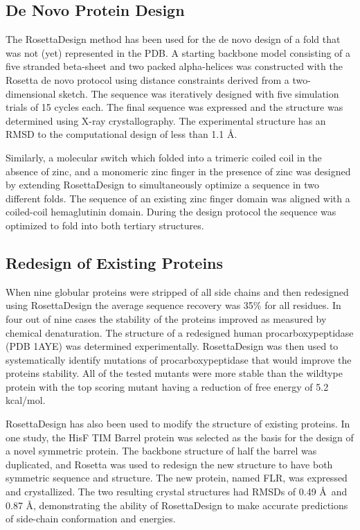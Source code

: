 \subsection{De Novo Protein Design}

The RosettaDesign method has been used for the de novo design of a fold that was not (yet) represented in the PDB.
A starting backbone model consisting of a five stranded beta-sheet and two packed alpha-helices was constructed with the Rosetta de novo protocol using distance constraints derived from a two-dimensional sketch\citep{Rohl:2004dh}.
The sequence was iteratively designed with five simulation trials of 15 cycles each.
The final sequence was expressed and the structure was determined using X-ray crystallography.
The experimental structure has an RMSD to the computational design of less than 1.1 \AA\citep{Kuhlman:2003kp}. 

Similarly, a molecular switch which folded into a trimeric coiled coil in the absence of zinc, and a monomeric zinc finger in the presence of zinc was designed by extending RosettaDesign to simultaneously optimize a sequence in two different folds.
The sequence of an existing zinc finger domain was aligned with a coiled-coil hemaglutinin domain.
During the design protocol the sequence was optimized to fold into both tertiary structures\citep{Ambroggio:2006he}.

\subsection{Redesign of Existing Proteins}
When nine globular proteins were stripped of all side chains and then redesigned using RosettaDesign the average sequence recovery was 35\% for all residues\citep{Kuhlman:2003kp}.
In four out of nine cases the stability of the proteins improved as measured by chemical denaturation.
The structure of a redesigned human procarboxypeptidase (PDB 1AYE)\citep{GarciaSaez:1997cn} was determined experimentally.
RosettaDesign was then used to systematically identify mutations of procarboxypeptidase that would improve the proteins stability.
All of the tested mutants were more stable than the wildtype protein with the top scoring mutant having a reduction of free energy of 5.2 kcal/mol\citep{Dantas:2007iq}.

RosettaDesign has also been used to modify the structure of existing proteins.
In one study, the HisF TIM Barrel protein was selected as the basis for the design of a novel symmetric protein.
The backbone structure of half the barrel was duplicated, and Rosetta was used to redesign the new structure to have both symmetric sequence and structure.
The new protein, named FLR, was expressed and crystallized.
The two resulting crystal structures had RMSDs of 0.49 \AA\ and 0.87 \AA, demonstrating the ability of RosettaDesign to make accurate predictions of side-chain conformation and energies\citep{Fortenberry:2011hw}.

